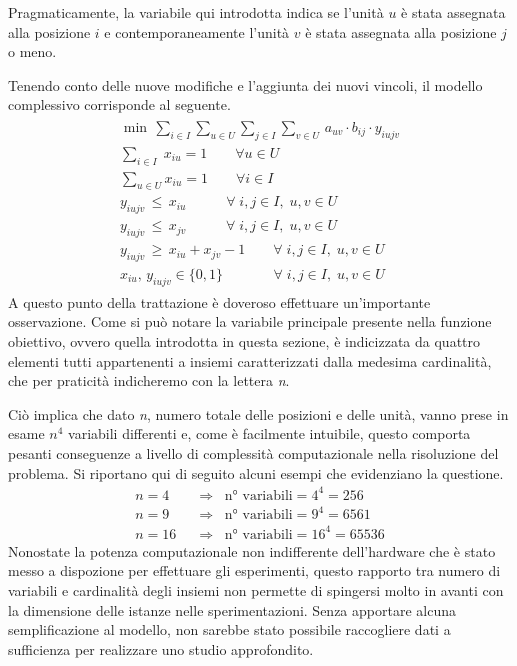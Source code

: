 Pragmaticamente, la variabile qui introdotta indica se l'unità $u$ è stata assegnata alla posizione $i$ e contemporaneamente 
l'unità $v$ è stata assegnata alla posizione $j$ o meno.

Tenendo conto delle nuove modifiche e l'aggiunta dei nuovi vincoli, il modello complessivo corrisponde al seguente.
\begin{align}
    \label{eq:mipqaplin}
	\begin{array}{l}
      \min \, \sum_{i\in I} \sum_{u\in U} \sum_{j\in I} \sum_{v\in U} \, a_{uv}\cdot b_{ij}\cdot y_{iujv} \\
      \sum_{i\in I} \; x_{iu} = 1  \qquad \forall u \in U \\
      \sum_{u\in U} x_{iu} = 1     \qquad \forall i \in I \\
      y_{iujv} \, \leq \, x_{iu}   \;\;\;\qquad \forall \; i,j \in I ,\; u,v \in U \\ 
      y_{iujv} \, \leq \, x_{jv}   \;\;\;\qquad \forall \; i,j \in I ,\; u,v \in U \\
      y_{iujv} \, \geq \, x_{iu} + x_{jv} - 1      \qquad \forall \; i,j \in I ,\; u,v \in U  \\
      x_{iu} ,\, y_{iujv} \in \{0,1\}   \;\,\,\quad\qquad \forall \; i,j \in I ,\; u,v \in U
    \end{array}
\end{align}
A questo punto della trattazione è doveroso effettuare un'importante osservazione. Come si può notare la variabile principale 
presente nella funzione obiettivo, ovvero quella introdotta in questa sezione, è indicizzata da quattro elementi tutti appartenenti 
a insiemi caratterizzati dalla medesima cardinalità, che per praticità indicheremo con la lettera \textit{n}. 

Ciò implica che dato \textit{n}, numero totale delle posizioni e delle unità, vanno prese in esame $n^4$ variabili differenti 
e, come è facilmente intuibile, questo comporta pesanti conseguenze a livello di complessità computazionale nella risoluzione 
del problema. Si riportano qui di seguito alcuni esempi che evidenziano la questione.
\begin{align*}
    n=4  \;\;&\Rightarrow\;\; \mbox{n° variabili} = 4^4 = 256 \\
    n=9  \;\;&\Rightarrow\;\; \mbox{n° variabili} = 9^4 = 6561 \\
    n=16 \;\;&\Rightarrow\;\; \mbox{n° variabili} = 16^4 = 65536
\end{align*}
Nonostate la potenza computazionale non indifferente dell'hardware che è stato messo a dispozione per effettuare gli esperimenti, 
questo rapporto tra numero di variabili e cardinalità degli insiemi non permette di spingersi molto in avanti con la dimensione delle 
istanze nelle sperimentazioni. Senza apportare alcuna semplificazione al modello, non sarebbe stato possibile raccogliere dati a 
sufficienza per realizzare uno studio approfondito.


